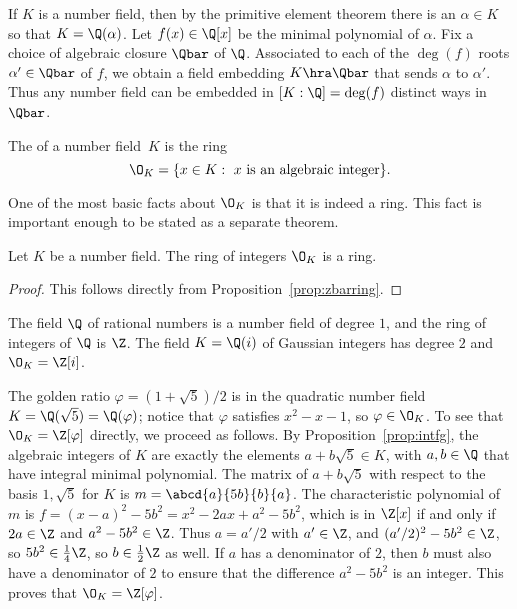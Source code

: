 If $K$ is a number field, then by the primitive element theorem there
is an $\alpha \in K$ so that $K = \Q(\alpha)$.  Let $f(x) \in \Q[x]$
be the minimal polynomial of $\alpha$.  Fix a choice of algebraic
closure $\Qbar$ of $\Q$.  Associated to each of the $\deg(f)$ roots
$\alpha'\in\Qbar$ of $f$, we obtain a field embedding $K\hra \Qbar$
that sends $\alpha$ to $\alpha'$.  Thus any number field can be
embedded in $[K:\Q]=\deg(f)$ distinct ways in $\Qbar$.

\begin{definition}
	The  of a number field~$K$ is the ring
	$$
		\O_K = \{x \in K : \text{ $x$ is an algebraic integer}\}.
	$$
\end{definition}

One of the most basic facts about $\O_K$ is that it is indeed a ring.
This fact is important enough to be stated as a separate theorem.

\begin{theorem}
	Let $K$ be a number field.
	The ring of integers $\O_K$ is a ring.
\end{theorem}
\begin{proof}
	This follows directly from Proposition~\ref{prop:zbarring}.
\end{proof}


\begin{example}
	The field $\Q$ of rational numbers is a number field of degree $1$,
	and the ring of integers of $\Q$ is $\Z$.  The field $K=\Q(i)$ of
	Gaussian integers has degree $2$ and $\O_K = \Z[i]$.
\end{example}

\begin{example}\label{example:Qsqrt5ringofints}
	The golden ratio $\varphi =(1+\sqrt{5})/2$ is in the quadratic
	number field $K=\Q(\sqrt{5})=\Q(\varphi)$; notice that
	$\varphi$ satisfies $x^2-x-1$, so $\varphi\in\O_K$.
	To see that $\O_K = \Z[\varphi]$ directly, we proceed as follows.
	By Proposition~\ref{prop:intfg}, the algebraic integers of $K$
	are exactly the elements $a+b\sqrt{5} \in K$, with $a,b\in\Q$
	that have integral minimal polynomial. The matrix of $a+b\sqrt{5}$
	with respect to the basis $1,\sqrt{5}$ for $K$ is
	$m=\abcd{a}{5b}{b}{a}$. The characteristic polynomial of $m$ is
	$f = (x-a)^2 - 5b^2 = x^2 - 2ax + a^2 - 5b^2$, which is in $\Z[x]$
	if and only if $2a\in\Z$ and $a^2-5b^2\in\Z$. Thus $a=a'/2$ with
	$a'\in\Z$, and $(a'/2)^2 - 5b^2 \in\Z$, so $5b^2 \in \frac{1}{4}\Z$,
	so $b\in\frac{1}{2}\Z$ as well. If $a$ has a denominator of $2$,
	then $b$ must also have a denominator of $2$ to ensure that the
	difference $a^2-5b^2$ is an integer. This proves that
	$\O_K = \Z[\varphi]$.
\end{example}

